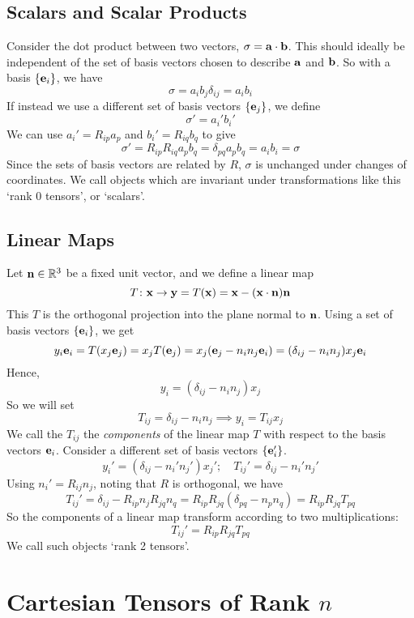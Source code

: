 \documentclass{article}
\begin{document}
\subsection{Scalars and Scalar Products}
Consider the dot product between two vectors, $\sigma = \vb a \cdot \vb b$. This should ideally be independent of the set of basis vectors chosen to describe $\vb a$ and $\vb b$. So with a basis $\{ \vb e_i \}$, we have
\[ \sigma = a_i b_j \delta_{ij} = a_i b_i \]
If instead we use a different set of basis vectors $\{ \vb e_j \}$, we define
\[ \sigma' = a_i' b_i' \]
We can use $a_i' = R_{ip} a_p$ and $b_i' = R_{iq} b_q$ to give
\[ \sigma' = R_{ip} R_{iq} a_p b_q = \delta_{pq} a_p b_q = a_i b_i = \sigma \]
Since the sets of basis vectors are related by $R$, $\sigma$ is unchanged under changes of coordinates. We call objects which are invariant under transformations like this `rank 0 tensors', or `scalars'.

\subsection{Linear Maps}
Let $\vb n \in \mathbb R^3$ be a fixed unit vector, and we define a linear map
\[ T \colon \vb x \to \vb y = T(\vb x) = \vb x - (\vb x \cdot \vb n) \vb n \]
This $T$ is the orthogonal projection into the plane normal to $\vb n$. Using a set of basis vectors $\{ \vb e_i \}$, we get
\[ y_i \vb e_i = T(x_j \vb e_j) = x_j T(\vb e_j) = x_j (\vb e_j - n_i n_j \vb e_i) = (\delta_{ij} - n_i n_j) x_j \vb e_i \]
Hence,
\[ y_i = (\delta_{ij} - n_i n_j) x_j \]
So we will set
\[ T_{ij} = \delta_{ij} - n_i n_j \implies y_i = T_{ij} x_j \]
We call the $T_{ij}$ the \textit{components} of the linear map $T$ with respect to the basis vectors $\vb e_i$. Consider a different set of basis vectors $\{ \vb e_i' \}$.
\[ y_i' = (\delta_{ij} - n_i' n_j') x_j';\quad T_{ij}' = \delta_{ij} - n_i' n_j' \]
Using $n_i' = R_{ij} n_j$, noting that $R$ is orthogonal, we have
\[ T_{ij}' = \delta_{ij} - R_{ip} n_j R_{jq} n_q = R_{ip} R_{jq} (\delta_{pq} - n_p n_q) = R_{ip} R_{jq} T_{pq} \]
So the components of a linear map transform according to two multiplications:
\[ T_{ij}' = R_{ip} R_{jq} T_{pq} \]
We call such objects `rank 2 tensors'.

\section{Cartesian Tensors of Rank $n$}
\end{document}
